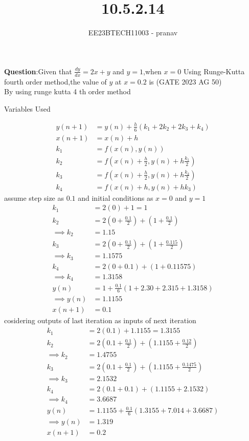 \documentclass[journal,12pt,twocolumn]{IEEEtran}
\theoremstyle{remark}
\begin{document}

\vspace{3cm}

\title{10.5.2.14}
\author{EE23BTECH11003 - pranav}
\maketitle
\newpage

\bigskip
\renewcommand{\thefigure}{\arabic{figure}}
\renewcommand{\thetable}{\arabic{table}}

\textbf{Question}:Given that $\frac{dy}{dx}=2x+y$ and $y=1$,when $x=0$ Using Runge-Kutta fourth order method,the value of $y$ at $x=0.2$ is \hfill(GATE 2023 AG 50) 
\solution\\
By using runge kutta 4 th order method\\
\begin{table}[h]
    \centering
    
    \caption{Variables Used}
    \label{ag:50}
\end{table}
\begin{align}
    y(n+1)&= y(n)+\frac{h}{6}(k_1+2k_2+2k_3+k_4)\\
    x(n+1)&=x(n)+h\\
    k_1&=f(x(n),y(n))\\
    k_2&=f(x(n)+\frac{h}{2},y(n)+h\frac{k_1}{2})\\
    k_3&=f(x(n)+\frac{h}{2},y(n)+h\frac{k_2}{2})\\
    k_4&=f(x(n)+h,y(n)+hk_3)
\end{align}
assume step size as $0.1$ and initial conditions as $x=0$ and $y=1$\\
\begin{align}
    k_1&=2(0)+1=1\\
    k_2&=2(0+\frac{0.1}{2})+(1+\frac{0.1}{2})\\
    \implies k_2&= 1.15\\
    k_3&=2(0+\frac{0.1}{2})+(1+\frac{0.115}{2})\\
    \implies k_3&=1.1575\\
    k_4&=2(0+0.1)+(1+0.11575)\\
    \implies k_4&=1.3158\\
    y(n)&=1+\frac{0.1}{6}(1+2.30+2.315+1.3158)\\
    \implies y(n)&=1.1155\\
    x(n+1)&=0.1
\end{align}
cosidering outputs of last iteration as inputs of next iteration\\
\begin{align}
    k_1&=2(0.1)+1.1155=1.3155\\
    k_2&=2(0.1+\frac{0.1}{2})+(1.1155+\frac{0.12}{2})\\
    \implies k_2&= 1.4755\\
    k_3&=2(0.1+\frac{0.1}{2})+(1.1155+\frac{0.1475}{2})\\
    \implies k_3&=2.1532\\
    k_4&=2(0.1+0.1)+(1.1155+2.1532)\\
    \implies k_4&=3.6687\\
    y(n) &=1.1155+\frac{0.1}{6}(1.3155+7.014+3.6687)\\
     \implies y(n)&=1.319\\
     x(n+1)&=0.2
\end{align}
\end{document}
